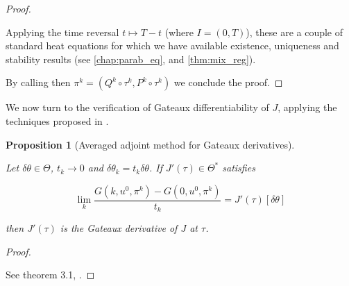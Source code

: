 \documentclass[english,a4paper,9pt,oneside]{scrbook}	%
\theoremstyle{break}
\newtheorem{prop}[equation]{Proposition}
\newenvironment{mproof}[1][\proofname]{%
  \begin{proof}[#1]$ $\par\nobreak\ignorespaces
}{%
  \end{proof}
}
\renewcommand*{\proofname}{Proof}
\theoremstyle{remark}
\newcommand{\te}{\theta}
\newcommand{\Te}{\Theta}
\begin{document}
\begin{mproof}
Applying the time reversal $t\mapsto T -t$ (where $I = (0,T)$), these are a couple of standard heat equations for which we have available existence, uniqueness and stability results (see \cref{chap:parab_eq}, and \cref{thm:mix_reg}).

By calling then $\pi^k = (Q^k \circ \tau^k,P^k \circ \tau^k)$ we conclude the proof.
\end{mproof}

We now turn to the verification of Gateaux differentiability of $J$, applying the techniques proposed in \cite{avg_adj}.

\begin{prop}[Averaged adjoint method for Gateaux derivatives]
\label{prop:adv_adj}

Let $\delta \te \in \Te$, $t_k\rightarrow 0$ and $\delta\te_k = t_k\delta \te$. If $J'(\tau) \in \Te^*$ satisfies

$$\lim_{k}\frac{G(k,u^0,\pi^k)-G(0,u^0,\pi^k)}{t_k}=J'(\tau)[\delta \te]$$

then $J'(\tau)$ is the Gateaux derivative of $J$ at $\tau$.

\end{prop}

\begin{mproof}

See theorem 3.1, \cite{avg_adj}.
\end{mproof}
\end{document}

